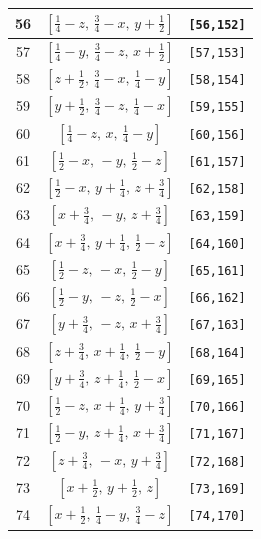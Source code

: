 \documentclass[fleqn,8pt]{jsarticle}
\begin{document}
\begin{longtable}{ccc}
56 & $\left[ \frac{1}{4} - z,\, \frac{3}{4} - x,\, y + \frac{1}{2} \right]$ & {\tt [56,152]} \\ \hline
57 & $\left[ \frac{1}{4} - y,\, \frac{3}{4} - z,\, x + \frac{1}{2} \right]$ & {\tt [57,153]} \\ \hline
58 & $\left[ z + \frac{1}{2},\, \frac{3}{4} - x,\, \frac{1}{4} - y \right]$ & {\tt [58,154]} \\ \hline
59 & $\left[ y + \frac{1}{2},\, \frac{3}{4} - z,\, \frac{1}{4} - x \right]$ & {\tt [59,155]} \\ \hline
60 & $\left[ \frac{1}{4} - z,\, x,\, \frac{1}{4} - y \right]$ & {\tt [60,156]} \\ \hline
61 & $\left[ \frac{1}{2} - x,\, - y,\, \frac{1}{2} - z \right]$ & {\tt [61,157]} \\ \hline
62 & $\left[ \frac{1}{2} - x,\, y + \frac{1}{4},\, z + \frac{3}{4} \right]$ & {\tt [62,158]} \\ \hline
63 & $\left[ x + \frac{3}{4},\, - y,\, z + \frac{3}{4} \right]$ & {\tt [63,159]} \\ \hline
64 & $\left[ x + \frac{3}{4},\, y + \frac{1}{4},\, \frac{1}{2} - z \right]$ & {\tt [64,160]} \\ \hline
65 & $\left[ \frac{1}{2} - z,\, - x,\, \frac{1}{2} - y \right]$ & {\tt [65,161]} \\ \hline
66 & $\left[ \frac{1}{2} - y,\, - z,\, \frac{1}{2} - x \right]$ & {\tt [66,162]} \\ \hline
67 & $\left[ y + \frac{3}{4},\, - z,\, x + \frac{3}{4} \right]$ & {\tt [67,163]} \\ \hline
68 & $\left[ z + \frac{3}{4},\, x + \frac{1}{4},\, \frac{1}{2} - y \right]$ & {\tt [68,164]} \\ \hline
69 & $\left[ y + \frac{3}{4},\, z + \frac{1}{4},\, \frac{1}{2} - x \right]$ & {\tt [69,165]} \\ \hline
70 & $\left[ \frac{1}{2} - z,\, x + \frac{1}{4},\, y + \frac{3}{4} \right]$ & {\tt [70,166]} \\ \hline
71 & $\left[ \frac{1}{2} - y,\, z + \frac{1}{4},\, x + \frac{3}{4} \right]$ & {\tt [71,167]} \\ \hline
72 & $\left[ z + \frac{3}{4},\, - x,\, y + \frac{3}{4} \right]$ & {\tt [72,168]} \\ \hline
73 & $\left[ x + \frac{1}{2},\, y + \frac{1}{2},\, z \right]$ & {\tt [73,169]} \\ \hline
74 & $\left[ x + \frac{1}{2},\, \frac{1}{4} - y,\, \frac{3}{4} - z \right]$ & {\tt [74,170]} \\ \hline

\end{longtable}
\end{document}
